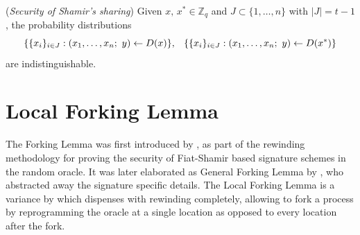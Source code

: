 \documentclass{iacrtrans}
\begin{document}

\begin{rem}\label{shamir_security}
(\textit{Security of Shamir's sharing})
Given $x,\hspace{2pt} x^* \in \mathbb{Z}_q$ and
$J \subset \{1, \dots, n\}$ with $|J| = t - 1$,
the probability distributions
\vspace{5pt}
\begin{equation*}
\{\{x_i\}_{i \in J}:
(x_1, \dots, x_n;\ y) \leftarrow D(x)\},
\hspace{8pt}
\{\{x_i\}_{i \in J}:
(x_1, \dots, x_n;\ y) \leftarrow D(x^*)\}
\vspace{5pt}
\end{equation*}
are indistinguishable.
\end{rem}

\section{Local Forking Lemma}\label{section_local_forking_lemma}

\noindent
The Forking Lemma was first introduced by
\cite{paper_pointcheval_stern_1}, \cite{paper_pointcheval_stern_2}
as part of the rewinding methodology for proving
the security of Fiat-Shamir based signature schemes
in the random oracle. It was later elaborated as
General Forking Lemma by \cite{paper_bellare_musig}, who
abstracted away the signature specific details.
The Local Forking Lemma is a variance
by \cite{paper_bellare_local_forking}
which dispenses with rewinding completely,
allowing to fork a process
by reprogramming the oracle at a single location
as opposed to every location after the fork.
\end{document}
